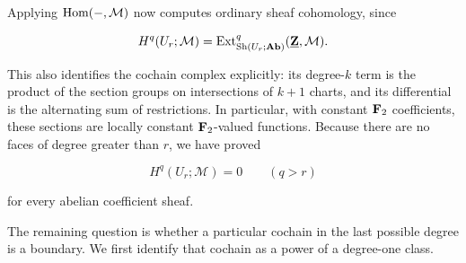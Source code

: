 Applying \(\operatorname{Hom}(-,\mathcal M)\) now computes ordinary sheaf
cohomology, since

\[
H^q(U_r;\mathcal M)
=\operatorname{Ext}^q_{\operatorname{Sh}(U_r;\mathbf{Ab})}(\underline{\mathbf Z},\mathcal M).
\]

This also identifies the cochain complex explicitly: its degree-\(k\)
term is the product of the section groups on intersections of \(k+1\)
charts, and its differential is the alternating sum of restrictions.
In particular, with constant \(\mathbf F_2\) coefficients, these sections are
locally constant \(\mathbf F_2\)-valued functions. Because there are no faces
of degree greater than \(r\), we have proved

\[
H^q(U_r;\mathcal M)=0\qquad(q>r)
\]

for every abelian coefficient sheaf.

The remaining question is whether a particular cochain in the last
possible degree is a boundary. We first identify that cochain as a
power of a degree-one class.
